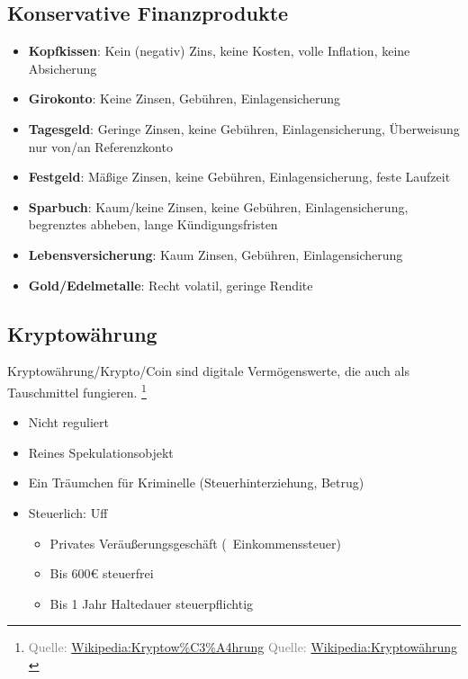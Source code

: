 \documentclass{beamer}
\let\oldfootnote\footnote
\renewcommand{\footnote}[1]
{%
	\oldfootnote
	{
		\tiny
		\textcolor{gray}{#1}
	}%
}
\newcommand{\citewiki}[2][]
{%
	\footnote
	{
		\ifthenelse{\isempty{#1}}
		{
			Quelle: \href{https://de.wikipedia.org/wiki/#2}{Wikipedia:#2}
		}
		{
			Quelle: \href{https://de.wikipedia.org/wiki/#2}{Wikipedia:#1}
		}
	}
}
\begin{document}
		\subsection{Konservative Finanzprodukte}
		
			\begin{frame}
				\begin{itemize}
					\item \textbf{Kopfkissen}: Kein (negativ) Zins, keine Kosten, volle Inflation, keine Absicherung\pause
					\item \textbf{Girokonto}: Keine Zinsen, Gebühren, Einlagensicherung\pause
					\item \textbf{Tagesgeld}: Geringe Zinsen, keine Gebühren, Einlagensicherung, Überweisung nur von/an Referenzkonto\pause
					\item \textbf{Festgeld}: Mäßige Zinsen, keine Gebühren, Einlagensicherung, feste Laufzeit\pause
					\item \textbf{Sparbuch}: Kaum/keine Zinsen, keine Gebühren, Einlagensicherung, begrenztes abheben, lange Kündigungsfristen\pause
					\item \textbf{Lebensversicherung}: Kaum Zinsen, Gebühren, Einlagensicherung\pause
					\item \textbf{Gold/Edelmetalle}: Recht volatil, geringe Rendite
				\end{itemize}
			\end{frame}
		
		\subsection{Kryptowährung}
		
			\begin{frame}
				\begin{definition}
					Kryptowährung/Krypto/Coin sind digitale Vermögenswerte, die auch als Tauschmittel fungieren.\citewiki[Kryptowährung]{Kryptow\%C3\%A4hrung}
				\end{definition}
			
				\begin{itemize}
					\item Nicht reguliert
					\item Reines Spekulationsobjekt
					\item Ein Träumchen für Kriminelle (Steuerhinterziehung, Betrug)
					\item Steuerlich: Uff
					\begin{itemize}
						\item Privates Veräußerungsgeschäft (\textrightarrow\ Einkommenssteuer)
						\item Bis 600€ steuerfrei
						\item Bis 1 Jahr Haltedauer steuerpflichtig
					\end{itemize}
				\end{itemize}
			\end{frame}
	
\end{document}
